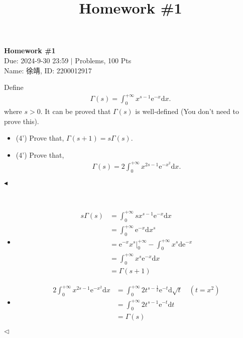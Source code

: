 \documentclass[11pt]{article}
\title{Homework \#1}
\newenvironment{problem}[2][Problem]{\begin{trivlist}
\item[\hskip \labelsep {\bfseries #1}\hskip \labelsep {\bfseries #2.}]}{\hfill$\blacktriangleleft$\end{trivlist}}
\newenvironment{answer}[1][Answer]{\begin{trivlist}
\item[\hskip \labelsep {\bfseries #1.}\hskip \labelsep]}{\hfill$\lhd$\end{trivlist}}
\begin{document}
\pagestyle{fancy}
\chead{}

\begin{center}
    {\LARGE \bf Homework \#1}\\
    {Due: 2024-9-30 23:59 \quad$|$ Problems, 100 Pts}\\
    {Name: 徐靖, ID: 2200012917}            %
\end{center}



\begin{problem}{1 (8')}
Define
\begin{align*}
    \Gamma(s) = \int_{0}^{+\infty} x^{s - 1} \mathrm{e}^{-x} \mathrm{d}x.
\end{align*}
where $s>0$. It can be proved that $\Gamma(s)$ is well-defined (You don't need to prove this).
\begin{itemize}
    \item [(1)] (4') Prove that, $\Gamma(s+1)=s\Gamma(s)$.
    \item [(2)] (4') Prove that,
    \begin{align*}
        \Gamma(s)=2\int_{0}^{+\infty}x^{2s-1}\mathrm{e}^{-x^2}\mathrm{d}x.
    \end{align*}
\end{itemize}
\end{problem}

\begin{answer} ~
\begin{itemize}
    \item [(1)] 
$$\begin{align*}
s\Gamma(s)&=\int_{0}^{+\infty}sx^{s-1}\mathrm e^{-x}\mathrm dx\\
&=\int_{0}^{+\infty}\mathrm e^{-x}\mathrm dx^s\\
&=\mathrm e^{-x}x^s\Big|_0^{+\infty}-\int_{0}^{+\infty}x^{s}\mathrm d\mathrm e^{-x}\\
&=\int_{0}^{+\infty}x^{s}\mathrm e^{-x}\mathrm dx\\
&=\Gamma(s+1)
\end{align*}$$
    \item [(2)] 
$$\begin{align*}
2\int_{0}^{+\infty}x^{2s-1}\mathrm{e}^{-x^2}\mathrm{d}x &= \int_{0}^{+\infty}2t^{s-\frac{1}{2}}\mathrm e^{-t}\mathrm d \sqrt{t} \quad (t=x^2)\\
&= \int_{0}^{+\infty}2t^{s-1}\mathrm e^{-t}\mathrm dt\\
&= \Gamma (s)
\end{align*}$$
\end{itemize}
\end{answer}
\end{document}
